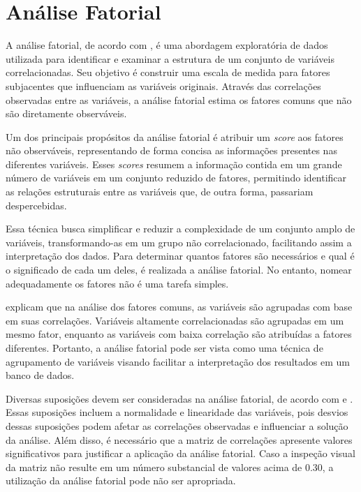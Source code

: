 \newpage

\section{Análise Fatorial}

A análise fatorial, de acordo com , é uma abordagem exploratória de dados utilizada para identificar e examinar a estrutura de um conjunto de variáveis correlacionadas. Seu objetivo é construir uma escala de medida para fatores subjacentes que influenciam as variáveis originais. Através das correlações observadas entre as variáveis, a análise fatorial estima os fatores comuns que não são diretamente observáveis.

Um dos principais propósitos da análise fatorial é atribuir um \textit{score} aos fatores não observáveis, representando de forma concisa as informações presentes nas diferentes variáveis. Esses \textit{scores} resumem a informação contida em um grande número de variáveis em um conjunto reduzido de fatores, permitindo identificar as relações estruturais entre as variáveis que, de outra forma, passariam despercebidas.

Essa técnica busca simplificar e reduzir a complexidade de um conjunto amplo de variáveis, transformando-as em um grupo não correlacionado, facilitando assim a interpretação dos dados. Para determinar quantos fatores são necessários e qual é o significado de cada um deles, é realizada a análise fatorial. No entanto, nomear adequadamente os fatores não é uma tarefa simples.

 explicam que na análise dos fatores comuns, as variáveis são agrupadas com base em suas correlações. Variáveis altamente correlacionadas são agrupadas em um mesmo fator, enquanto as variáveis com baixa correlação são atribuídas a fatores diferentes. Portanto, a análise fatorial pode ser vista como uma técnica de agrupamento de variáveis visando facilitar a interpretação dos resultados em um banco de dados.

Diversas suposições devem ser consideradas na análise fatorial, de acordo com  e . Essas suposições incluem a normalidade e linearidade das variáveis, pois desvios dessas suposições podem afetar as correlações observadas e influenciar a solução da análise. Além disso, é necessário que a matriz de correlações apresente valores significativos para justificar a aplicação da análise fatorial. Caso a inspeção visual da matriz não resulte em um número substancial de valores acima de 0.30, a utilização da análise fatorial pode não ser apropriada.

